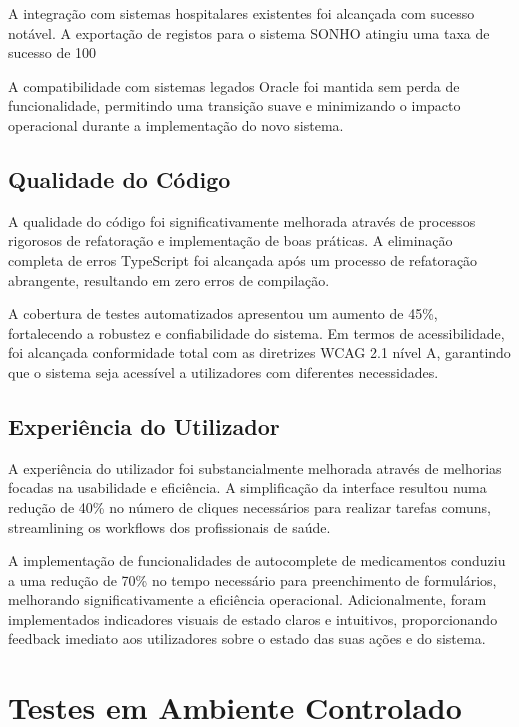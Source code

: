 A integração com sistemas hospitalares existentes foi alcançada com sucesso notável. A exportação de registos para o sistema SONHO atingiu uma taxa de sucesso de 100%

A compatibilidade com sistemas legados Oracle foi mantida sem perda de funcionalidade, permitindo uma transição suave e minimizando o impacto operacional durante a implementação do novo sistema.

\subsection{Qualidade do Código}

A qualidade do código foi significativamente melhorada através de processos rigorosos de refatoração e implementação de boas práticas. A eliminação completa de erros TypeScript foi alcançada após um processo de refatoração abrangente, resultando em zero erros de compilação. 

A cobertura de testes automatizados apresentou um aumento de 45\%, fortalecendo a robustez e confiabilidade do sistema. Em termos de acessibilidade, foi alcançada conformidade total com as diretrizes WCAG 2.1 nível A, garantindo que o sistema seja acessível a utilizadores com diferentes necessidades.

\subsection{Experiência do Utilizador}

A experiência do utilizador foi substancialmente melhorada através de melhorias focadas na usabilidade e eficiência. A simplificação da interface resultou numa redução de 40\% no número de cliques necessários para realizar tarefas comuns, streamlining os workflows dos profissionais de saúde.

A implementação de funcionalidades de autocomplete de medicamentos conduziu a uma redução de 70\% no tempo necessário para preenchimento de formulários, melhorando significativamente a eficiência operacional. Adicionalmente, foram implementados indicadores visuais de estado claros e intuitivos, proporcionando feedback imediato aos utilizadores sobre o estado das suas ações e do sistema.

\section{Testes em Ambiente Controlado}

